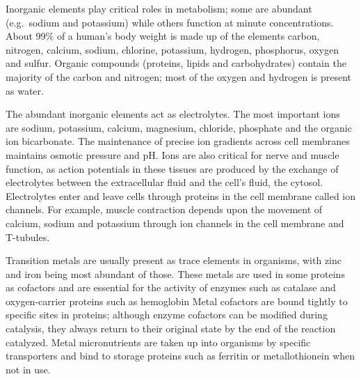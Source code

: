 Inorganic elements play critical roles in metabolism; some are abundant (e.g.~sodium and potassium) while others function at minute concentrations. About 99\% of a human's body weight is made up of the elements carbon, nitrogen, calcium, sodium, chlorine, potassium, hydrogen, phosphorus, oxygen and sulfur. Organic compounds (proteins, lipids and carbohydrates) contain the majority of the carbon and nitrogen; most of the oxygen and hydrogen is present as water.

The abundant inorganic elements act as electrolytes. The most important ions are sodium, potassium, calcium, magnesium, chloride, phosphate and the organic ion bicarbonate. The maintenance of precise ion gradients across cell membranes maintains osmotic pressure and pH. Ions are also critical for nerve and muscle function, as action potentials in these tissues are produced by the exchange of electrolytes between the extracellular fluid and the cell's fluid, the cytosol. Electrolytes enter and leave cells through proteins in the cell membrane called ion channels. For example, muscle contraction depends upon the movement of calcium, sodium and potassium through ion channels in the cell membrane and T-tubules.

Transition metals are usually present as trace elements in organisms, with zinc and iron being most abundant of those. These metals are used in some proteins as cofactors and are essential for the activity of enzymes such as catalase and oxygen-carrier proteins such as hemoglobin Metal cofactors are bound tightly to specific sites in proteins; although enzyme cofactors can be modified during catalysis, they always return to their original state by the end of the reaction catalyzed. Metal micronutrients are taken up into organisms by specific transporters and bind to storage proteins such as ferritin or metallothionein when not in use.


